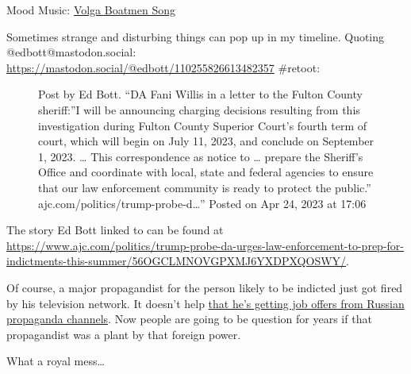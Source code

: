 Mood Music:
\href{https://archive.org/details/78_the-boatmen-of-the-volga-bourlake-de-volga_choir-of-the-red-army-of-the-ussr_gbia0071384b}{Volga
Boatmen Song}

Sometimes strange and disturbing things can pop up in my timeline.
Quoting @edbott@mastodon.social:
\url{https://mastodon.social/@edbott/110255826613482357} \#retoot:

\begin{figure}
\centering
{}
\caption{Post by Ed Bott. ``DA Fani Willis in a letter to the Fulton
County sheriff:''I will be announcing charging decisions resulting from
this investigation during Fulton County Superior Court's fourth term of
court, which will begin on July 11, 2023, and conclude on September 1,
2023. \ldots{} This correspondence as notice to \ldots{} prepare the
Sheriff's Office and coordinate with local, state and federal agencies
to ensure that our law enforcement community is ready to protect the
public.'' ajc.com/politics/trump-probe-d\ldots'' Posted on Apr 24, 2023
at 17:06}
\end{figure}

The story Ed Bott linked to can be found at
\url{https://www.ajc.com/politics/trump-probe-da-urges-law-enforcement-to-prep-for-indictments-this-summer/56OGCLMNOVGPXMJ6YXDPXQOSWY/}.

Of course, a major propagandist for the person likely to be indicted
just got fired by his television network. It doesn't help
\href{https://www.businessinsider.com/russia-to-tucker-carlson-run-for-president-visit-moscow-2023-4}{that
he's getting job offers from Russian propaganda channels}. Now people
are going to be question for years if that propagandist was a plant by
that foreign power.

What a royal mess\ldots{}
